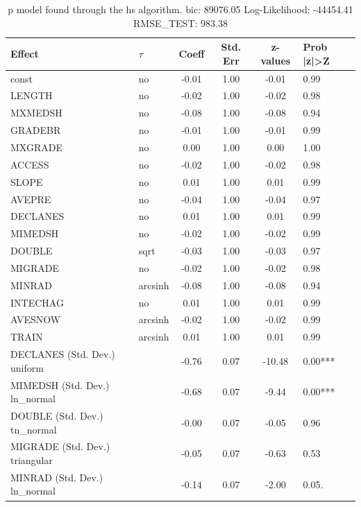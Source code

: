 \begin{table}
	\caption{p model found through the hs algorithm. bic: 89076.05 Log-Likelihood: -44454.41 RMSE_TEST: 983.38}
	\begin{center}
		\begin{tabular}{|l|l|c|c|c|l|}
			\hline
			Effect & $\tau$ & Coeff & Std. Err & z-values & Prob |z|>Z \\
			\hline
			const & no & -0.01 & 1.00 & -0.01 & 0.99 \\
			\hline
			LENGTH & no & -0.02 & 1.00 & -0.02 & 0.98 \\
			\hline
			MXMEDSH & no & -0.08 & 1.00 & -0.08 & 0.94 \\
			\hline
			GRADEBR & no & -0.01 & 1.00 & -0.01 & 0.99 \\
			\hline
			MXGRADE & no & 0.00 & 1.00 & 0.00 & 1.00 \\
			\hline
			ACCESS & no & -0.02 & 1.00 & -0.02 & 0.98 \\
			\hline
			SLOPE & no & 0.01 & 1.00 & 0.01 & 0.99 \\
			\hline
			AVEPRE & no & -0.04 & 1.00 & -0.04 & 0.97 \\
			\hline
			DECLANES & no & 0.01 & 1.00 & 0.01 & 0.99 \\
			\hline
			MIMEDSH & no & -0.02 & 1.00 & -0.02 & 0.99 \\
			\hline
			DOUBLE & sqrt & -0.03 & 1.00 & -0.03 & 0.97 \\
			\hline
			MIGRADE & no & -0.02 & 1.00 & -0.02 & 0.98 \\
			\hline
			MINRAD & arcsinh & -0.08 & 1.00 & -0.08 & 0.94 \\
			\hline
			INTECHAG & no & 0.01 & 1.00 & 0.01 & 0.99 \\
			\hline
			AVESNOW & arcsinh & -0.02 & 1.00 & -0.02 & 0.99 \\
			\hline
			TRAIN & arcsinh & 0.01 & 1.00 & 0.01 & 0.99 \\
			\hline
			DECLANES (Std. Dev.) uniform &  & -0.76 & 0.07 & -10.48 & 0.00*** \\
			\hline
			MIMEDSH (Std. Dev.) ln_normal &  & -0.68 & 0.07 & -9.44 & 0.00*** \\
			\hline
			DOUBLE (Std. Dev.) tn_normal &  & -0.00 & 0.07 & -0.05 & 0.96 \\
			\hline
			MIGRADE (Std. Dev.) triangular &  & -0.05 & 0.07 & -0.63 & 0.53 \\
			\hline
			MINRAD (Std. Dev.) ln_normal &  & -0.14 & 0.07 & -2.00 & 0.05. \\
			\hline

\end{tabular}
\end{center}
\end{table}
